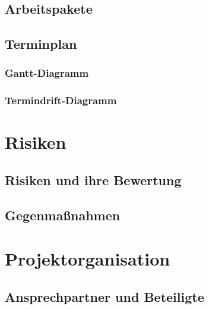 \documentclass[11pt]{article}
\begin{document}
\subsection{Arbeitspakete}

\subsection{Terminplan}

\subsubsection{Gantt-Diagramm}

\subsubsection{Termindrift-Diagramm}

\section{Risiken}

\subsection{Risiken und ihre Bewertung}

\subsection{Gegenmaßnahmen}

\section{Projektorganisation}

\subsection{Ansprechpartner und Beteiligte}
\end{document}
